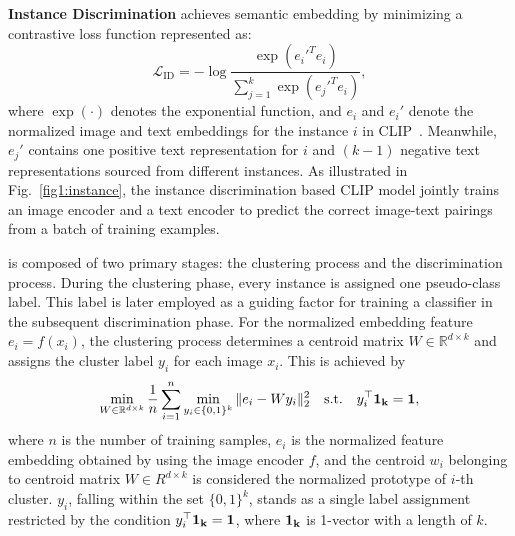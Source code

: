 \noindent\textbf{Instance Discrimination} achieves semantic embedding by minimizing a contrastive loss function represented as:
\vspace{-2mm}
\begin{equation}
\label{eqn:ID}
\mathcal{L}_\mathrm{ID} = - \log \frac{\exp(e_i'^T e_i   )}{\sum_{j=1}^k\exp(e_j'^T e_i   ) },
\end{equation}
where $\exp(\cdot)$ denotes the exponential function, and $e_i$ and $e_i'$ denote the normalized image and text embeddings for the instance $i$ in CLIP~\cite{radford2021learning}. Meanwhile, $e_j'$ contains one positive text representation for $i$ and $(k-1)$ negative text representations sourced from different instances. As illustrated in Fig.~\ref{fig1:instance}, the instance discrimination based CLIP model jointly trains an image encoder and a text encoder to predict the correct image-text pairings from a batch of training examples.

is composed of two primary stages: the clustering process and the discrimination process.
During the clustering phase, every instance is assigned one pseudo-class label. This label is later employed as a guiding factor for training a classifier in the subsequent discrimination phase. 
For the normalized embedding feature $e_i = f(x_i)$,
the clustering process determines a centroid matrix $W \in \mathbb{R}^{d\times k}$ and assigns the cluster label $y_i$ for each image $x_i$. This is achieved by
\vspace{-2mm}
\begin{equation}
\label{eq:kmeans}
\min_{W \in \mathbb{R}^{d\times k}}
\frac{1}{n}
\sum_{i=1}^n
\min_{y_i \in \{0,1\}^{k}}
\| e_i  -  W y_i \|_2^2
\quad
\text{s.t.}
\quad
y_i^\top \bf{1}_k = 1,
\end{equation}
where $n$ is the number of training samples, $e_i$ is the normalized feature embedding obtained by using the image encoder $f$, and
the centroid $w_i$ belonging to centroid matrix $W\in {R}^{d\times k}$ is considered the normalized prototype of $i$-th cluster. $y_i$, falling within the set $\{0,1\}^k$, stands as a single label assignment restricted by the condition $y_i^\top \bf{1}_k = 1$, where $ \bf{1}_k $ is 1-vector with a length of $k$. 

